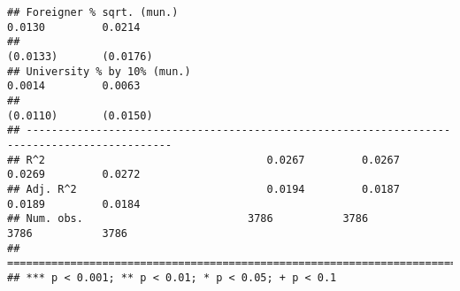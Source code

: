 \documentclass[
]{article}
\begin{document}
\begin{verbatim}
## Foreigner % sqrt. (mun.)                                            0.0130         0.0214    
##                                                                    (0.0133)       (0.0176)   
## University % by 10% (mun.)                                          0.0014         0.0063    
##                                                                    (0.0110)       (0.0150)   
## ---------------------------------------------------------------------------------------------
## R^2                                   0.0267         0.0267         0.0269         0.0272    
## Adj. R^2                              0.0194         0.0187         0.0189         0.0184    
## Num. obs.                          3786           3786           3786           3786         
## =============================================================================================
## *** p < 0.001; ** p < 0.01; * p < 0.05; + p < 0.1
\end{verbatim}
\end{document}
